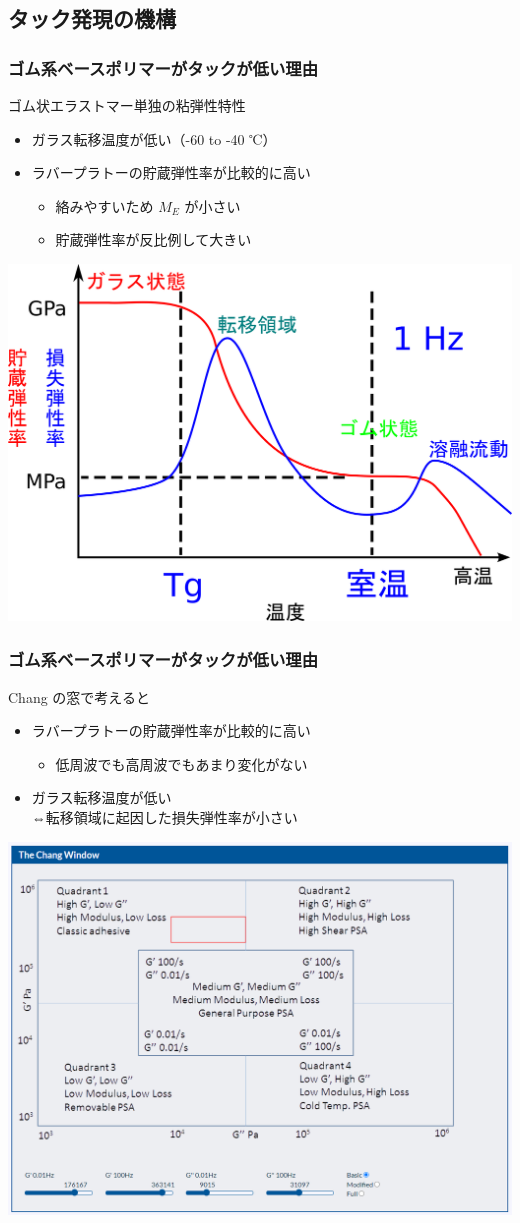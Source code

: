\documentclass[unicode,12pt]{beamer}%
\begin{document}
\subsection{タック発現の機構}
\begin{frame}
	\frametitle{ゴム系ベースポリマーがタックが低い理由}
		\begin{block}{ゴム状エラストマー単独の粘弾性特性}
		\begin{itemize}
			\item ガラス転移温度が低い（-60 to -40 ℃）
			\item ラバープラトーの貯蔵弾性率が比較的に高い
			\begin{itemize}
				\item 絡みやすいため $M_E$ が小さい
				\item 貯蔵弾性率が反比例して大きい
			\end{itemize}
		\end{itemize}
	\end{block}
		\centering
			\includegraphics[width=.5\textwidth]{dynamic_ViscoElast_Temp_rubber.png}
\end{frame}

\begin{frame}
	\frametitle{ゴム系ベースポリマーがタックが低い理由}
	\begin{block}{Chang の窓で考えると}
		\begin{itemize}
			\item ラバープラトーの貯蔵弾性率が比較的に高い
			\begin{itemize}
				\item 低周波でも高周波でもあまり変化がない
			\end{itemize}
			\item ガラス転移温度が低い\\⇔転移領域に起因した損失弾性率が小さい
		\end{itemize}
	\end{block}
		\centering
			\includegraphics[width=.45\textwidth]{ChangFrequencies_rubber.png}
\end{frame}
\end{document}

